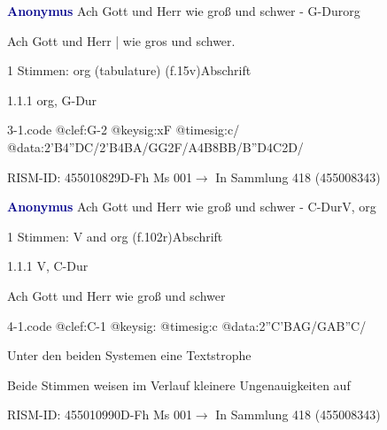 \documentclass[twocolumn]{book}
\begin{document}
\par \vspace{7pt} \textcolor{darkblue}{\textbf{Anonymus  }}\hfillplus{\textbf{[3]}}\newline Ach Gott und Herr wie groß und schwer - G-Dur\newline org
\par \begin{itshape}[f.15v, at left:] Ach Gott und Herr | wie gros und schwer.\end{itshape} 
\par \textcolor{darkblue}{}  1 Stimmen: org (tabulature)  (f.15v)\newline Abschrift
\par 1.1.1  org, G-Dur  
\begin{filecontents*}{3-1.code}
@clef:G-2
@keysig:xF
@timesig:c/
@data:2'B4''DC/2'B4BA/GG2F/A4B{8BB}/{B''D}4C2D/
\end{filecontents*}
\newline
%
\par RISM-ID: 455010829\newline D-Fh  Ms 001\newline $\rightarrow$ In Sammlung 418 (455008343)
      
\par \vspace{7pt} \textcolor{darkblue}{\textbf{Anonymus  }}\hfillplus{\textbf{[4]}}\newline Ach Gott und Herr wie groß und schwer - C-Dur\newline V, org
\par \begin{itshape}\end{itshape} 
\par \textcolor{darkblue}{}  1 Stimmen: V and org  (f.102r)\newline Abschrift
\par 1.1.1  V, C-Dur\newline \begin{footnotesize} Ach Gott und Herr wie groß und schwer \end{footnotesize}  
\begin{filecontents*}{4-1.code}
@clef:C-1
@keysig:
@timesig:c
@data:2''C'BAG/GAB''C/
\end{filecontents*}
\newline
%
\par Unter den beiden Systemen eine Textstrophe
\par Beide Stimmen weisen im Verlauf kleinere Ungenauigkeiten auf
\par RISM-ID: 455010990\newline D-Fh  Ms 001\newline $\rightarrow$ In Sammlung 418 (455008343)
      
\end{document}
